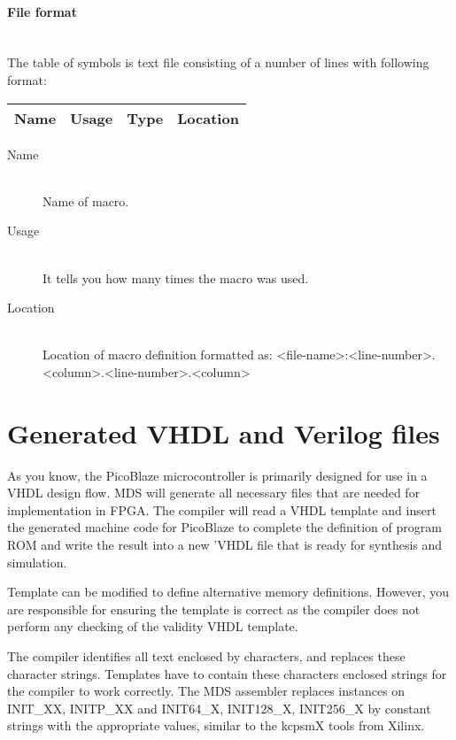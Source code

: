     \paragraph{File format}
        ~\\
        The table of symbols is text file consisting of a number of lines with following format:\\
        \begin{tabular}{|cccc|}
            \hline
            Name & Usage & Type & Location \\
            \hline
        \end{tabular}

    \begin{description}
        \item[Name]~\\
            Name of macro.
        \item[Usage]~\\
            It tells you how many times the macro was used.
        \item[Location]~\\
            Location of macro definition formatted as: <file-name>:<line-number>.<column>.<line-number>.<column>
    \end{description}

\section{Generated VHDL and Verilog files}
    As you know, the PicoBlaze microcontroller is primarily designed for use in a VHDL design flow. MDS will generate all necessary files that are needed for implementation in FPGA. The compiler will read a VHDL template and insert the generated machine code for PicoBlaze to complete the definition of program ROM and write the result into a new 'VHDL file that is ready for synthesis and simulation.

    Template can be modified to define alternative memory definitions. However, you are responsible for ensuring the template is correct as the compiler does not perform any checking of the validity VHDL template.

    The compiler identifies all text enclosed by {} characters, and replaces these character strings. Templates have to contain these {} characters enclosed strings for the compiler to work correctly. The MDS assembler replaces instances on {INIT\_XX}, {INITP\_XX} and {INIT64\_X}, {INIT128\_X}, {INIT256\_X} by constant strings with the appropriate values, similar to the kcpsmX tools from Xilinx.

